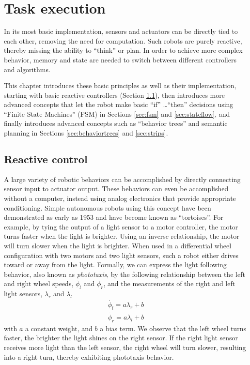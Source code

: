 \chapter{Task execution}
In its most basic implementation, sensors and actuators can be directly tied to each other, removing the need for computation. Such robots are purely reactive, thereby missing the ability to ``think'' or plan. In order to achieve more complex behavior, memory and state are needed to switch between different controllers and algorithms.

This chapter introduces these basic principles as well as their implementation, starting with basic reactive controllers (Section \ref{sec:braitenberg}), then introduces more advanced concepts that let the robot make basic ``if'' \ldots ``then'' decisions using ``Finite State Machines'' (FSM) in Sections \ref{sec:fsm} and \ref{sec:stateflow}, and finally introduces advanced concepts such as ``behavior trees'' and semantic planning in Sections \ref{sec:behaviortrees} and \ref{sec:strips}.

\section{Reactive control}\label{sec:braitenberg}
A large variety of robotic behaviors can be accomplished by directly connecting sensor input to actuator output. These behaviors can even be accomplished without a computer, instead using analog electronics that provide appropriate conditioning. Simple autonomous robots using this concept have been demonstrated as early as 1953 \cite{walter1953living} and have become known as ``tortoises''. For example, by tying the output of a light sensor to a motor controller, the motor turns faster when the light is brighter. Using an inverse relationship, the motor will turn slower when the light is brighter. When used in a differential wheel configuration with two motors and two light sensors, such a robot either drives toward or away from the light. Formally, we can express the light following behavior, also known as \emph{phototaxis}, by the following relationship between
the left and right wheel speeds, $\dot{\phi_l}$ and $\dot{\phi_r}$, and the measurements of the right and left light sensors, $\lambda_r$ and $\lambda_l$
\begin{eqnarray}\label{eq:simplereactive}
\dot{\phi_l}=a \lambda_r + b\\
\dot{\phi_r}=a \lambda_l + b
\end{eqnarray}
with $a$ a constant weight, and $b$ a bias term. We observe that the left wheel turns faster, the brighter the light shines on the right sensor. If the right light sensor receives more light than the left sensor, the right wheel will turn slower, resulting into a right turn, thereby exhibiting phototaxis behavior.

